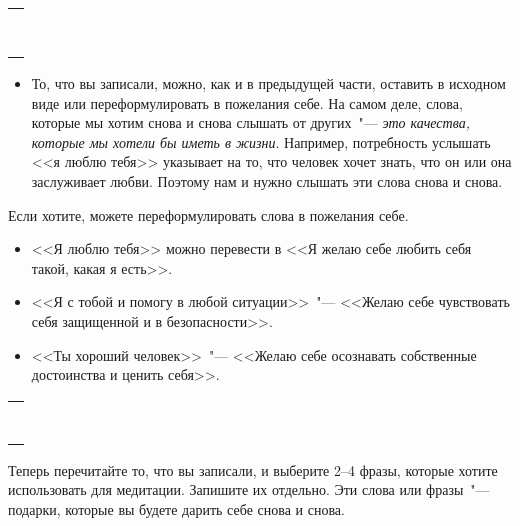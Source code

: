 \setlength{\extrarowheight}{2mm}
\begin{tabularx}{\textwidth}{X}
	\\
	\arrayrulecolor{gray}\hline\\
	\hline\\
	\hline\\
	\hline\\
	\hline\\
	\hline\\
	\hline\\
	\hline\\
	\hline\\
\end{tabularx}
\setlength{\extrarowheight}{0mm}
\begin{itemize}
	\item То, что вы записали, можно, как и в предыдущей части, оставить в исходном виде или переформулировать в пожелания себе. На самом деле, слова, которые мы хотим снова и снова слышать  от других~"--- \emph{это качества, которые мы хотели бы иметь в жизни}. Например, потребность услышать <<я люблю тебя>> указывает на то, что человек хочет знать, что он или она заслуживает любви. Поэтому нам и нужно слышать эти слова снова и снова.
\end{itemize}

\vspace{4ex}

\begin{itemize}
	\itemWritingHand Если хотите, можете переформулировать слова в пожелания себе.
	\begin{itemize}
		\item <<Я люблю тебя>> можно перевести в <<Я желаю себе любить себя такой, какая я есть>>.
		
		\item <<Я с тобой и помогу в любой ситуации>>~"--- <<Желаю себе чувствовать себя защищенной и в безопасности>>.
		
		\item <<Ты хороший человек>>~"--- <<Желаю себе осознавать собственные достоинства и ценить себя>>.
	\end{itemize}
\end{itemize}

\setlength{\extrarowheight}{2mm}
\begin{tabularx}{\textwidth}{X}
	\\
	\arrayrulecolor{gray}\hline\\
	\hline\\
	\hline\\
	\hline\\
	\hline\\
	\hline\\
	\hline\\
	\hline\\
\end{tabularx}
\setlength{\extrarowheight}{0mm}
\begin{itemize}
	\itemWritingHand Теперь перечитайте то, что вы записали, и выберите 2--4 фразы, которые хотите использовать для медитации. Запишите их отдельно. Эти слова или фразы~"--- подарки, которые вы будете дарить себе снова и снова.
\end{itemize}

